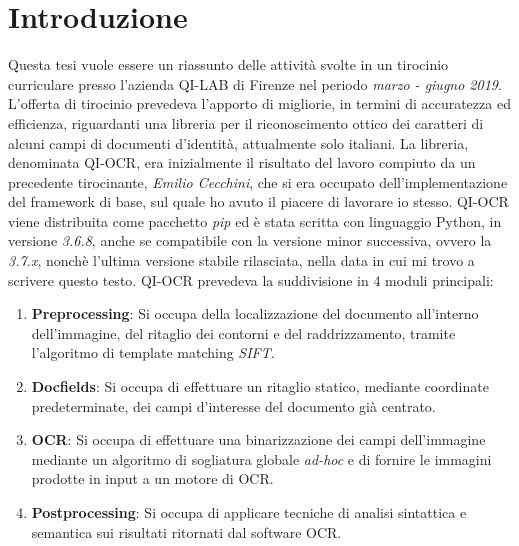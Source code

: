 \chapter*{Introduzione}

Questa tesi vuole essere un riassunto delle attivit\`a svolte in un tirocinio curriculare presso l'azienda QI-LAB di Firenze nel periodo \textit{marzo - giugno 2019}. L'offerta di tirocinio prevedeva l'apporto di migliorie, in termini di accuratezza ed efficienza, riguardanti una libreria per il riconoscimento ottico dei caratteri di alcuni campi di documenti d'identit\`a, attualmente solo italiani. La libreria, denominata QI-OCR, era inizialmente il risultato del lavoro compiuto da un precedente tirocinante, \textit{Emilio Cecchini}, che si era occupato dell'implementazione del framework di base, sul quale ho avuto il piacere di lavorare io stesso. QI-OCR viene distribuita come pacchetto \textit{pip} ed \`e stata scritta con linguaggio Python, in versione \textit{3.6.8}, anche se compatibile con la versione minor successiva, ovvero la \textit{3.7.x}, nonch\`e l'ultima versione stabile rilasciata, nella data in cui mi trovo a scrivere questo testo. QI-OCR prevedeva la suddivisione in 4 moduli principali:
\begin{enumerate}
	\item \textbf{Preprocessing}: Si occupa della localizzazione del documento all'interno dell'immagine, del ritaglio dei contorni e del raddrizzamento, tramite l'algoritmo di template matching \textit{SIFT}.
	\item \textbf{Docfields}: Si occupa di effettuare un ritaglio statico, mediante coordinate predeterminate, dei campi d'interesse del documento gi\`a centrato.
	\item \textbf{OCR}: Si occupa di effettuare una binarizzazione dei campi dell'immagine mediante un algoritmo di sogliatura globale \textit{ad-hoc} e di fornire le immagini prodotte in input a un motore di OCR.
	\item \textbf{Postprocessing}: Si occupa di applicare tecniche di analisi sintattica e semantica sui risultati ritornati dal software OCR.
\end{enumerate}
